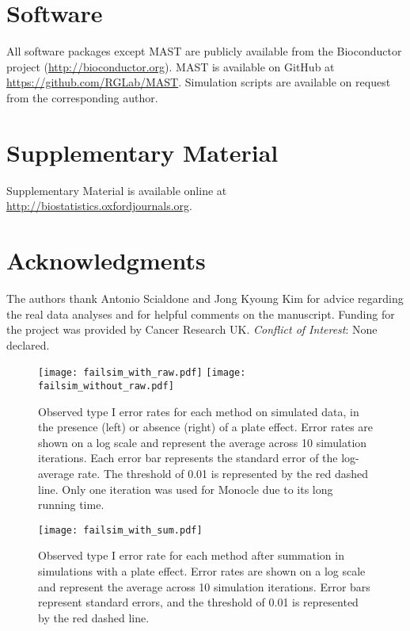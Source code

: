 \documentclass[oupdraft]{bio}
\begin{document}
\section{Software}
\label{sec5}
All software packages except MAST are publicly available from the Bioconductor project (\url{http://bioconductor.org}).
MAST is available on GitHub at \url{https://github.com/RGLab/MAST}.
Simulation scripts are available on request from the corresponding author.

\section{Supplementary Material}
Supplementary Material is available online at \href{http://biostatistics.oxfordjournals.org}{http://biostatistics.oxfordjournals.org}.

\section*{Acknowledgments}
The authors thank Antonio Scialdone and Jong Kyoung Kim for advice regarding the real data analyses and for helpful comments on the manuscript.
Funding for the project was provided by Cancer Research UK.
{\it Conflict of Interest}: None declared.




\begin{figure}[!p]
\begin{center}
\texttt{[image: failsim\_with\_raw.pdf]}
\texttt{[image: failsim\_without\_raw.pdf]}
\end{center}
\caption{
    Observed type I error rates for each method on simulated data, in the presence (left) or absence (right) of a plate effect.
    Error rates are shown on a log scale and represent the average across 10 simulation iterations.
    Each error bar represents the standard error of the log-average rate.
    The threshold of 0.01 is represented by the red dashed line.
    Only one iteration was used for Monocle due to its long running time.
}
\label{fig:platefail}
\end{figure}

\begin{figure}[!p]
\begin{center}
\texttt{[image: failsim\_with\_sum.pdf]}
\end{center}
\caption{
    Observed type I error rate for each method after summation in simulations with a plate effect.
    Error rates are shown on a log scale and represent the average across 10 simulation iterations.
    Error bars represent standard errors, and the threshold of 0.01 is represented by the red dashed line.
}
\label{fig:platesum}
\end{figure}
\end{document}
